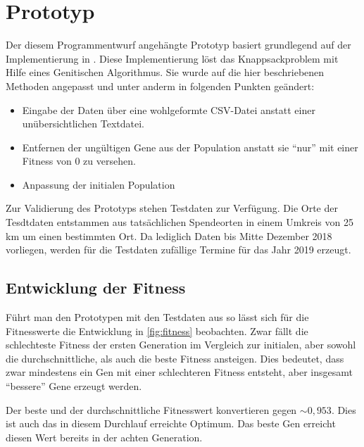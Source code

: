 \section{Prototyp}\label{sec:prototyp}

Der diesem Programmentwurf angehängte Prototyp basiert grundlegend auf der Implementierung in \cite{Quiz15Th91:online}.
Diese Implementierung löst das Knappsackproblem mit Hilfe eines Genitischen Algorithmus.
Sie wurde auf die hier beschriebenen Methoden angepasst und unter anderm
in folgenden Punkten geändert:
\begin{itemize}
    \item Eingabe der Daten über eine wohlgeformte CSV-Datei anstatt einer unübersichtlichen Textdatei.
    \item Entfernen der ungültigen Gene aus der Population anstatt sie \enquote{nur} mit einer Fitness von $0$ zu versehen.
    \item Anpassung der initialen Population
\end{itemize}


\noindent
Zur Validierung des Prototyps stehen Testdaten zur Verfügung.
Die Orte der Tesdtdaten entstammen aus tatsächlichen Spendeorten in einem Umkreis von 25 km um einen bestimmten Ort.
Da lediglich Daten bis Mitte Dezember 2018 vorliegen,
werden für die Testdaten zufällige Termine für das Jahr 2019 erzeugt.



\subsection{Entwicklung der Fitness}

Führt man den Prototypen mit den Testdaten aus so lässt sich für die Fitnesswerte die Entwicklung in \autoref{fig:fitness} beobachten.
Zwar fällt die schlechteste Fitness der ersten Generation im Vergleich zur initialen,
aber sowohl die durchschnittliche, als auch die beste Fitness ansteigen.
Dies bedeutet, dass zwar mindestens ein Gen mit einer schlechteren Fitness entsteht,
aber insgesamt \enquote{bessere} Gene erzeugt werden.

Der beste und der durchschnittliche Fitnesswert konvertieren gegen $\sim 0,953$.
Dies ist auch das in diesem Durchlauf erreichte Optimum.
Das beste Gen erreicht diesen Wert bereits in der achten Generation.

